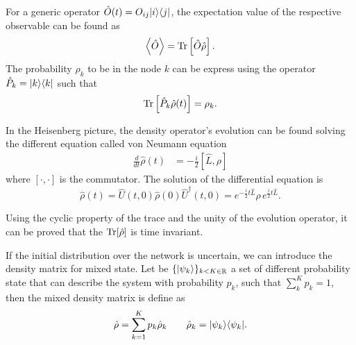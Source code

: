 For a generic operator $\hat O(t) = O_{ij}\lvert i\rangle\langle j\rvert$, the expectation value of the respective observable can be found as \cite{Nielsen_Chuang_2010}
\begin{equation}
        \left< \hat O\right> = \operatorname{Tr}\left[\hat O\hat\rho\right].
\end{equation}
The probability $\rho_k$ to be in the node $k$ can be express using the operator $\hat P_k = \lvert k\rangle\langle k\rvert$ such that
\begin{equation} \label{state_projection_quantum}
    \begin{split}
        \operatorname{Tr}\left[\hat P_k\hat\rho(t)\right] 
        = \rho_k.
    \end{split}
\end{equation}

In the Heisenberg picture, the density operator's evolution can be found solving the different equation called von Neumann equation
\begin{equation}\label{Von Neumann equation}
    \begin{split}
        \frac{d}{dt}\hat\rho(t) 
        &= -\frac{i}{2}\left[\hat L,\rho\right]
    \end{split}
\end{equation}
where $[\cdot,\cdot]$ is the commutator.
The solution of the differential equation is
\begin{equation}
    \hat\rho(t) = \hat U(t,0)\hat\rho(0)\hat U^\dagger(t,0) = e^{-\frac{i}{2}t\hat L}\hat\rho\, e^{\frac{i}{2}t\hat L}.
\end{equation}

Using the cyclic property of the trace and the unity of the evolution operator, it can be proved that the $\operatorname{Tr}[\hat\rho]$ is time invariant.

If the initial distribution over the network is uncertain, we can introduce the density matrix for mixed state. Let be $\{\lvert\psi_k\rangle\}_{k<K\in\mathbb{R}}$ a set of different probability state that can describe the system with probability $p_k$, such that $\sum_k^K p_k = 1$, then the mixed density matrix is define as
\begin{equation}
    \hat \rho = \sum_{k=1}^K p_k \hat \rho_k \qquad \hat\rho_k = \lvert\psi_k\rangle\langle\psi_k\rvert.
\end{equation}

